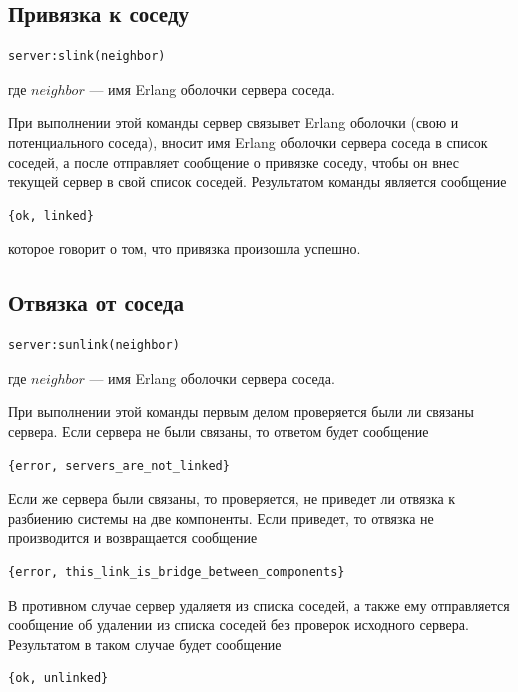 		\subsection{Привязка к соседу}
			\begin{lstlisting}
server:slink(neighbor)
			\end{lstlisting}
			где $neighbor$ --- имя Erlang оболочки сервера соседа.

			При выполнении этой команды сервер связывет Erlang оболочки (свою и потенциального соседа), вносит имя Erlang оболочки сервера соседа 
			в список соседей, а после отправляет сообщение о привязке соседу, чтобы он внес текущей сервер в свой список соседей. Результатом команды 
			является сообщение 
			\begin{lstlisting}
{ok, linked}
			\end{lstlisting}
			которое говорит о том, что привязка произошла успешно.

		\subsection{Отвязка от соседа}
			\begin{lstlisting}
server:sunlink(neighbor)
			\end{lstlisting}
			где $neighbor$ --- имя Erlang оболочки сервера соседа.

			При выполнении этой команды первым делом проверяется были ли связаны сервера. Если сервера не были связаны, то ответом будет сообщение
			\begin{lstlisting}
{error, servers_are_not_linked}
			\end{lstlisting}
			Если же сервера были связаны, то проверяется, не приведет ли отвязка к разбиению системы на две компоненты. Если приведет, то отвязка не 
			производится и возвращается сообщение
			\begin{lstlisting}
{error, this_link_is_bridge_between_components}
			\end{lstlisting}
			В противном случае сервер удаляетя из списка соседей, а также ему отправляется сообщение об удалении из списка соседей без проверок
			исходного сервера. Результатом в таком случае будет сообщение
			\begin{lstlisting}
{ok, unlinked}
			\end{lstlisting}
			


